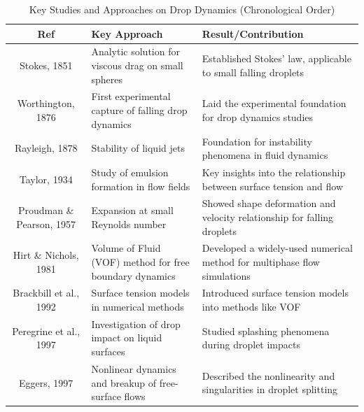 \documentclass[12pt]{article}
\begin{document}
\begin{table}[htbp]
\scriptsize
\centering
\caption{Key Studies and Approaches on Drop Dynamics (Chronological Order)}
\renewcommand{\arraystretch}{1.2} %
\begin{tabularx}{\textwidth}{|c|X|X|}
\hline
\textbf{Ref}                 & \textbf{Key Approach}                                                 & \textbf{Result/Contribution}                                                            \\ \hline
Stokes, 1851\cite{stokes1851pendulums}                  & Analytic solution for viscous drag on small spheres                    & Established Stokes' law, applicable to small falling droplets                           \\ \hline
Worthington, 1876  \cite{worthington1876study}          & First experimental capture of falling drop dynamics                    & Laid the experimental foundation for drop dynamics studies                              \\ \hline
Rayleigh, 1878               & Stability of liquid jets                                               & Foundation for instability phenomena in fluid dynamics                                  \\ \hline
Taylor, 1934                 & Study of emulsion formation in flow fields                             & Key insights into the relationship between surface tension and flow                     \\ \hline
Proudman \& Pearson, 1957    & Expansion at small Reynolds number                                     & Showed shape deformation and velocity relationship for falling droplets                 \\ \hline
Hirt \& Nichols, 1981        & Volume of Fluid (VOF) method for free boundary dynamics                & Developed a widely-used numerical method for multiphase flow simulations                \\ \hline
Brackbill et al., 1992       & Surface tension models in numerical methods                            & Introduced surface tension models into methods like VOF                                 \\ \hline
Peregrine et al., 1997       & Investigation of drop impact on liquid surfaces                        & Studied splashing phenomena during droplet impacts                                      \\ \hline
Eggers, 1997                 & Nonlinear dynamics and breakup of free-surface flows                   & Described the nonlinearity and singularities in droplet splitting                       \\ \hline

\end{tabularx}
\end{table}
\end{document}
